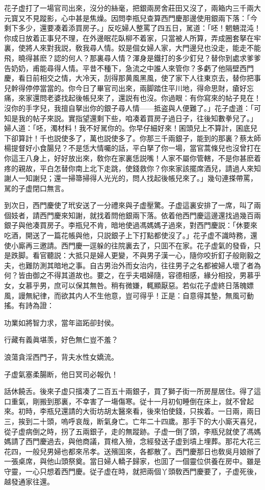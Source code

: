 花子虚打了一場官司出來，沒分的絲毫，把銀兩房舍莊田又沒了，兩箱内三千兩大元寳又不見蹤影，心中甚是焦燥。因問李瓶兒查算西門慶那邊使用銀兩下落：「今剩下多少，還要凑着添買房子。」反吃婦人整罵了四五日，駡道：「呸！魍魎混沌！你成日放着正事兒不理，在外邊眠花臥柳不着家，只當被人所算，弄成圈套拏在牢裏，使將人來對我説，敎我尋人情。奴是個女婦人家，大門邊兒也没走，能走不能飛，曉得甚麽？認的何人？那裏尋人情？渾身是鐵打的多少釘兒？替你到處求爹爹告奶奶，甫能尋得人情。平昔不種下，急流之中誰人來管你？多虧了他隔壁西門慶，看日前相交之情，大冷天，刮得那黄風黑風，使了家下人往東京去，替你把事兒幹得停停當當的。你今日了畢官司出來，兩脚踏住平川地，得命思財，瘡好忘痛，來家還問老婆找起後帳兒來了，還説有也沒。你過眼：有你寫來的帖子見在！沒你的手字兒，我擅自拏出你的銀子尋人情——抵盗與人便難了。」花子虚道：「可知是我的帖子來説。實指望還剩下些，咱凑着買房子過日子，往後知數拳兒了。」婦人道：「呸，濁材料！我不好駡你的。你早仔細好來！囷頭兒上不算計，囷底兒下卻算計！千也説使多了，萬也説使多了。你那三千兩銀子，能到的那裏？蔡太師楊提督好小食腸兒？不是恁大情囑的話，平白拏了你一場，當官蒿條兒也沒曾打在你這王八身上，好好放出來，敎你在家裏恁説嘴！人家不屬你管轄，不是你甚麽着疼的親故，平白怎替你南上北下走跳，使錢救你？你來家該擺席酒兒，請過人來知謝人一知謝兒；還一掃箒掃得人光光的，問人找起後帳兒來了。」幾句連搽帶罵，駡的子虚閉口無言。

到次日，西門慶使了玳安送了一分禮來與子虚壓驚。子虚這裏安排了一席，叫了兩個妓者，請西門慶來知謝，就找着問他銀兩下落。依着他西門慶這邊還找過幾百兩銀子與他凑買房子。李瓶兒不肯，暗地使過馮媽媽子過來，對西門慶説：「休要來吃酒，開送了一篇花帳與他，只説銀子上下打點都使沒了。」花子虚不識時務，還使小廝再三邀請。西門慶一逕躲的往院裏去了，只囬不在家。花子虚氣的發昏，只是跌脚。看官聽説：大抵只是婦人更變，不與男子漢一心，隨你咬折釘子般剛毅之夫，也難防測其暗地之事。自古男治外而女治内，往往男子之名都被婦人壞了者為何？皆由御之不得其道故也。要之，在乎夫唱婦隨，容德相感，緣分相投，男慕乎女，女慕乎男，庶可以保其無咎。稍有微嫌，輒顯厭惡。若似花子虚終日落魄嫖風，謾無紀律，而欲其内人不生他意，豈可得乎！正是：自意得其墊，無風可動搖。有詩為證：

\begin{myquote}
功業如將智力求，當年盜跖卻封侯。

行藏有義眞堪羡，好色無仁豈不羞？

浪蕩貪淫西門子，背夫水性女嬌流。

子虚氣塞柔腸断，他日冥司必報仇！
\end{myquote}

話休饒舌。後來子虚只擯凑了二百五十兩銀子，買了獅子街一所房屋居住。得了這口重氣，剛搬到那裏，不幸害了一塲傷寒。従十一月初旬睡倒在床上，就不曾起來。初時，李瓶兒還請的大街坊胡太醫來看，後來怕使錢，只挨着。一日兩，兩日三，挨到二十頭，嗚呼哀哉，断氣身亡。亡年二十四歲。那手下的大小廝天喜兒，從子虚病倒之時，拐了五兩銀子，走的無蹤跡。子虚一倒了頭，李瓶兒就使了馮媽媽請了西門慶過去，與他商議，買棺入殮，念經發送子虚到墳上埋葬。那花大花三花四，一般兒男婦也都來吊孝。送殯囬來，各都散了。西門慶那日也敎吳月娘辦了一張桌席，與他山頭祭奠。當日婦人轎子歸家，也囬了一個靈位供養在房中。雖是守靈，一心只想着西門慶。従子虚在時，就把兩個丫頭敎西門慶要了，子虚死後，越發通家往還。

